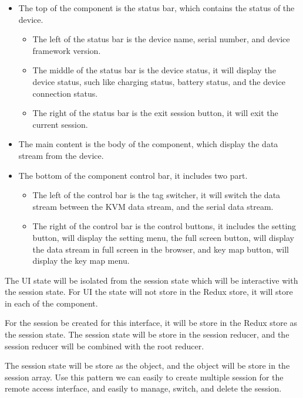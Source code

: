 \begin{itemize}
    \item The top of the component is the status bar, which contains the status of the device.
    \begin{itemize}
        \item The left of the status bar is the device name, serial number, and device framework version.
        \item The middle of the status bar is the device status, it will display the device status, 
        such like charging status, battery status, and the device connection status.
        \item The right of the status bar is the exit session button, it will exit the current session.
    \end{itemize}
    \item The main content is the body of the component, which display the data stream from the device.
    \item The bottom of the component control bar, it includes two part.
    \begin{itemize}
        \item The left of the control bar is the tag switcher, it will switch the data stream between the
        KVM data stream, and the serial data stream.
        \item The right of the control bar is the control buttons, it includes the setting button, 
        will display the setting menu, the full screen button, will display the data stream in full screen
        in the browser, and key map button, will display the key map menu.
    \end{itemize}
\end{itemize}

The UI state will be isolated from the session state which will be interactive with the session state.
For UI the state will not store in the Redux store, it will store in each of the component.

For the session be created for this interface, it will be store in the Redux store as the session state.
The session state will be store in the session reducer, and the session reducer will be combined with
the root reducer. 

The session state will be store as the object, and the object will be store in the session array.
Use this pattern we can easily to create multiple session for the remote access interface, and easily to 
manage, switch, and delete the session.

